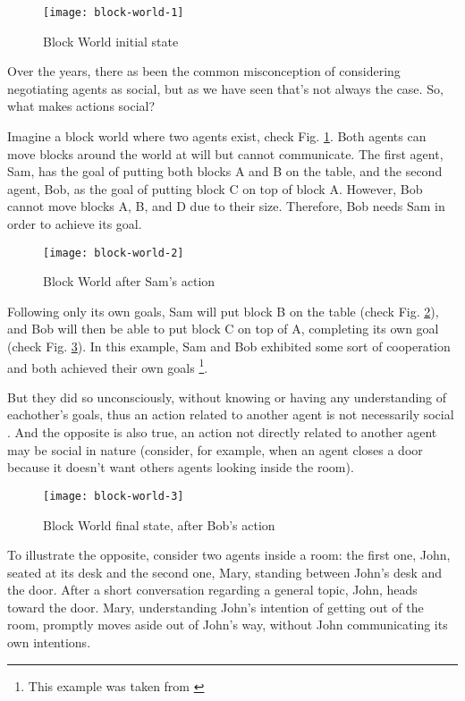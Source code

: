 \begin{figure}
  \centering
    \texttt{[image: block-world-1]}
  \caption{Block World initial state}
  \label{fig:block-world-1}
\end{figure}

Over the years, there as been the common misconception of considering negotiating agents as social, but as we have seen that's not always the case.
So, what makes actions social?

Imagine a block world where two agents exist, check Fig. \ref{fig:block-world-1}.
Both agents can move blocks around the world at will but cannot communicate.
The first agent, Sam, has the goal of putting both blocks A and B on the table, and the second agent, Bob, as the goal of putting block C on top of block A.
However, Bob cannot move blocks A, B, and D due to their size.
Therefore, Bob needs Sam in order to achieve its goal.

\begin{figure}
  \centering
    \texttt{[image: block-world-2]}
  \caption{Block World after Sam's action}
  \label{fig:block-world-2}
\end{figure}

Following only its own goals, Sam will put block B on the table (check Fig. \ref{fig:block-world-2}), and Bob will then be able to put block C on top of A, completing its own goal (check Fig. \ref{fig:block-world-3}).
In this example, Sam and Bob exhibited some sort of cooperation and both achieved their own goals \footnote{This example was taken from \cite{castelfranchi:socialactions}}.

But they did so unconsciously, without knowing or having any understanding of eachother's goals, thus an action related to another agent is not necessarily social \cite{castelfranchi:individualsocialaction}.
And the opposite is also true, an action not directly related to another agent may be social in nature (consider, for example, when an agent closes a door because it doesn't want others agents looking inside the room).

\begin{figure}
  \centering
    \texttt{[image: block-world-3]}
  \caption{Block World final state, after Bob's action}
  \label{fig:block-world-3}
\end{figure}

To illustrate the opposite, consider two agents inside a room: the first one, John, seated at its desk and the second one, Mary, standing between John's desk and the door.
After a short conversation regarding a general topic, John, heads toward the door.
Mary, understanding John's intention of getting out of the room, promptly moves aside out of John's way, without John communicating its own intentions.

